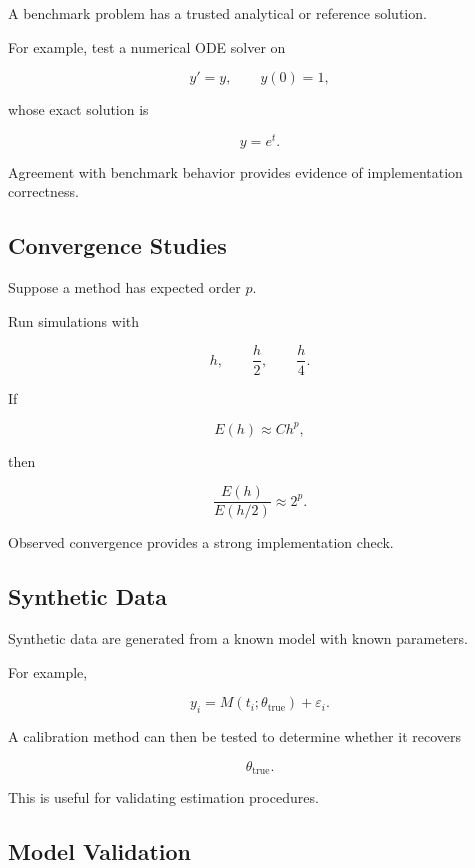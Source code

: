 A benchmark problem has a trusted analytical or reference solution.

For example, test a numerical ODE solver on

\[
\boxed{
y'=y,
\qquad
y(0)=1,
}
\]

whose exact solution is

\[
\boxed{
y=e^t.
}
\]

Agreement with benchmark behavior provides evidence of implementation
correctness.

\subsection{Convergence Studies}
\label{subsec:simulation-convergence-studies}

Suppose a method has expected order \(p\).

Run simulations with

\[
h,
\qquad
\frac h2,
\qquad
\frac h4.
\]

If

\[
E(h)
\approx
Ch^p,
\]

then

\[
\boxed{
\frac{
E(h)
}{
E(h/2)
}
\approx
2^p.
}
\]

Observed convergence provides a strong implementation check.

\subsection{Synthetic Data}
\label{subsec:simulation-synthetic-data}

Synthetic data are generated from a known model with known parameters.

For example,

\[
\boxed{
y_i
=
M(t_i;\theta_{\mathrm{true}})
+
\varepsilon_i.
}
\]

A calibration method can then be tested to determine whether it recovers

\[
\theta_{\mathrm{true}}.
\]

This is useful for validating estimation procedures.

\subsection{Model Validation}
\label{subsec:simulation-model-validation}

